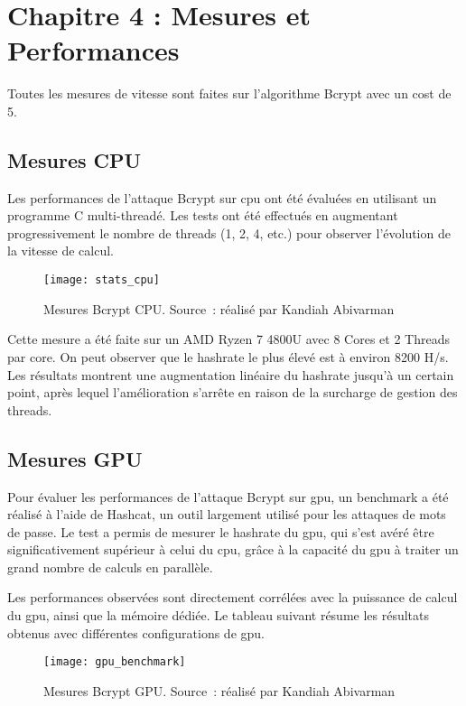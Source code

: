 \chapter{Chapitre 4 : Mesures et Performances}

Toutes les mesures de vitesse sont faites sur l'algorithme Bcrypt avec un cost de 5.

\section{Mesures CPU}

Les performances de l'attaque Bcrypt sur \gls{cpu} ont été évaluées en utilisant un programme C multi-threadé. 
Les tests ont été effectués en augmentant progressivement le nombre de threads (1, 2, 4, etc.) pour observer l'évolution de la vitesse de calcul. 

\begin{figure}[tbph!]
	\centering
	\texttt{[image: stats\_cpu]}
	\caption[Mesures Bcrypt CPU]{Mesures Bcrypt CPU. Source : réalisé par Kandiah Abivarman}
	\label{fig:cpu_measures}
\end{figure}

Cette mesure a été faite sur un AMD Ryzen 7 4800U avec 8 Cores et 2 Threads par core.
On peut observer que le hashrate le plus élevé est à environ 8200 H/s.
Les résultats montrent une augmentation linéaire du hashrate jusqu'à un certain point, après lequel l'amélioration s'arrête en raison de la surcharge de gestion des threads.

\section{Mesures GPU}

Pour évaluer les performances de l'attaque Bcrypt sur \gls{gpu}, un benchmark a été réalisé à l'aide de Hashcat, un outil largement utilisé pour les attaques de mots de passe. 
Le test a permis de mesurer le hashrate du \gls{gpu}, qui s'est avéré être significativement supérieur à celui du \gls{cpu}, grâce à la capacité du \gls{gpu} à traiter un grand nombre de calculs en parallèle.

Les performances observées sont directement corrélées avec la puissance de calcul du \gls{gpu}, ainsi que la mémoire dédiée. 
Le tableau suivant résume les résultats obtenus avec différentes configurations de \gls{gpu}.

\begin{figure}[tbph!]
	\centering
	\texttt{[image: gpu\_benchmark]}
	\caption[Mesures Bcrypt GPU]{Mesures Bcrypt GPU. Source : réalisé par Kandiah Abivarman}
	\label{fig:gpu_benchmark}
\end{figure}

